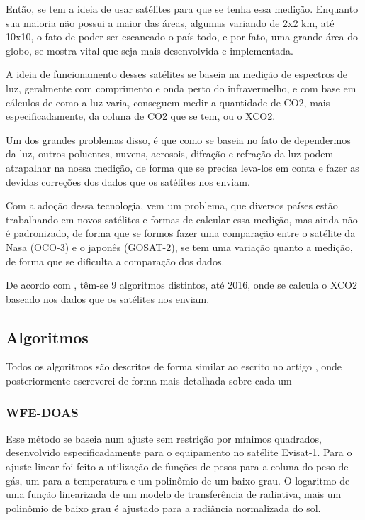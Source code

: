 \documentclass{article}[12pt]
\begin{document}
Então, se tem a ideia de usar satélites para que se tenha essa medição. Enquanto sua maioria não
possui a maior das áreas, algumas variando de 2x2 km, até 10x10, o fato de poder ser escaneado o
país todo, e por fato, uma grande área do globo, se mostra vital que seja mais desenvolvida e
implementada. \par

A ideia de funcionamento desses satélites se baseia na medição de espectros de luz, geralmente com
comprimento e onda perto do infravermelho, e com base em cálculos de como a luz varia, conseguem
medir a quantidade de CO2, mais especificadamente, da coluna de CO2 que se tem, ou o XCO2. \par

Um dos grandes problemas disso, é que como se baseia no fato de dependermos da luz, outros
poluentes, nuvens, aerosois, difração e refração da luz podem atrapalhar na nossa medição, de forma
que se precisa leva-los em conta e fazer as devidas correções dos dados que os satélites nos enviam.
\par

Com a adoção dessa tecnologia, vem um problema, que diversos países estão trabalhando em novos
satélites e formas de calcular essa medição, mas ainda não é padronizado, de forma
que se formos fazer uma comparação entre o satélite da Nasa (OCO-3) e o japonês (GOSAT-2), se tem
uma variação quanto a medição, de forma que se dificulta a comparação dos dados. \par

De acordo com , têm-se 9 algoritmos distintos, até 2016, onde se calcula o XCO2
baseado nos dados que os satélites nos enviam.
\subsection{Algoritmos}
Todos os algoritmos são descritos de forma similar ao escrito no artigo \cite{Yue2016}, onde
posteriormente escreverei de forma mais detalhada sobre cada um
\subsubsection{WFE-DOAS}
Esse método se baseia num ajuste sem restrição por mínimos quadrados, desenvolvido especificadamente
para o equipamento no satélite Evisat-1. Para o ajuste linear foi feito a utilização de funções de
pesos para a coluna do peso de gás, um para a temperatura e um polinômio de um baixo grau. O
logaritmo de uma função linearizada de um modelo de  transferência de radiativa, mais um polinômio
de baixo grau é ajustado para a radiância normalizada do sol. \par
\end{document}
